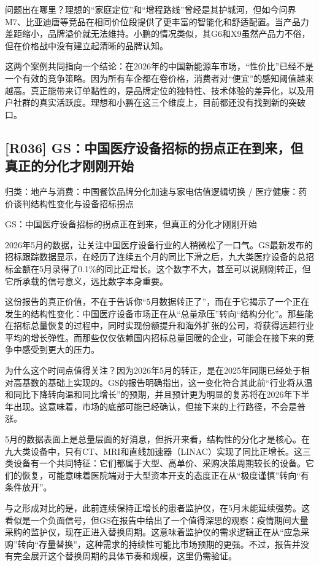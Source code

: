 \documentclass[11pt]{ctexart}
\begin{document}
问题出在哪里？理想的“家庭定位”和“增程路线”曾经是其护城河，但如今问界M7、比亚迪唐等竞品在相同价位段提供了更丰富的智能化和舒适配置。当产品力差距缩小，品牌溢价就无法维持。小鹏的情况类似，其G6和X9虽然产品力不俗，但在价格战中没有建立起清晰的品牌认知。

这两个案例共同指向一个结论：在2026年的中国新能源车市场，“性价比”已经不是一个有效的竞争策略。因为所有车企都在卷价格，消费者对“便宜”的感知阈值越来越高。真正能带来订单黏性的，是品牌定位的独特性、技术体验的差异化，以及用户社群的真实活跃度。理想和小鹏在这三个维度上，目前都还没有找到新的突破口。

\subsection{[R036] GS：中国医疗设备招标的拐点正在到来，但真正的分化才刚刚开始}
{\small\color{refgray}归类：地产与消费：中国餐饮品牌分化加速与家电估值逻辑切换 / 医疗健康：药价谈判结构性变化与设备招标拐点}

GS：中国医疗设备招标的拐点正在到来，但真正的分化才刚刚开始

2026年5月的数据，让关注中国医疗设备行业的人稍微松了一口气。GS最新发布的招标跟踪数据显示，在经历了连续五个月的同比下滑之后，九大类医疗设备的总招标金额在5月录得了0.1\%的同比正增长。这个数字不大，甚至可以说刚刚转正，但它所承载的信号意义，远比数字本身重要。

这份报告的真正价值，不在于告诉你“5月数据转正了”，而在于它揭示了一个正在发生的结构性变化：中国医疗设备市场正在从“总量承压”转向“结构分化”。那些能在招标总量恢复的过程中，同时实现份额提升和海外扩张的公司，将获得远超行业平均的增长弹性。而那些仅仅依赖国内招标总量回暖的企业，可能会在接下来的竞争中感受到更大的压力。

为什么这个时间点值得关注？因为2026年5月的转正，是在2025年同期已经处于相对高基数的基础上实现的。GS的报告明确指出，这一变化符合其此前“行业将从温和同比下降转向温和同比增长”的预期，并且预计更为明显的复苏将在2026年下半年出现。这意味着，市场的底部可能已经确认，但接下来的上行路径，不会是普涨。

5月的数据表面上是总量层面的好消息，但拆开来看，结构性的分化才是核心。在九大类设备中，只有CT、MRI和直线加速器（LINAC）实现了同比正增长。这三类设备有一个共同特征：它们都属于大型、高单价、采购决策周期较长的设备。它们的恢复，可能意味着医院端对于大型资本开支的态度正在从“极度谨慎”转向“有条件放开”。

与之形成对比的是，此前连续保持正增长的患者监护仪，在5月未能延续强势。这看似是一个负面信号，但GS在报告中给出了一个值得深思的观察：疫情期间大量采购的监护仪，现在正进入替换周期。这意味着监护仪的需求逻辑正在从“应急采购”转向“存量替换”，这种需求的持续性可能比市场预期的更强。不过，报告并没有完全展开这个替换周期的具体节奏和规模，这里仍需验证。
\end{document}
